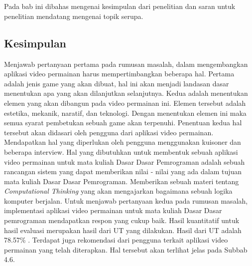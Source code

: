 \chapter{\babLima}
Pada bab ini dibahas mengenai kesimpulan dari penelitian dan saran untuk penelitian
mendatang mengenai topik serupa.
\section{Kesimpulan}
Menjawab pertanyaan pertama pada rumusan masalah, dalam mengembangkan aplikasi video permainan harus mempertimbangkan beberapa hal. Pertama adalah jenis game yang akan dibuat, hal ini akan menjadi landasan dasar menentukan apa yang akan dilanjutkan selanjutnya. Kedua adalah menentukan elemen yang akan dibangun pada video permainan ini. Elemen tersebut adalah estetika, mekanik, naratif, dan teknologi. Dengan menentukan elemen ini maka semua syarat pembetukan sebuah game akan terpenuhi. Penentuan kedua hal tersebut akan didasari oleh pengguna dari aplikasi video permainan. Mendapatkan hal yang diperlukan oleh pengguna menggunakan kuisoner dan beberapa interview. Hal yang dibutuhkan untuk membentuk sebuah aplikasi video permainan untuk mata kuliah Dasar Dasar Pemrograman adalah sebuah rancangan sistem yang dapat memberikan nilai - nilai yang ada dalam tujuan mata kuliah Dasar Dasar Pemrograman. Memberikan sebuah materi tentang \textit{Computational Thinking} yang akan mengajarkan bagaimana sebuah logika komputer berjalan.
\linebreak\linebreak
Untuk menjawab pertanyaan kedua pada rumusan masalah, implementasi aplikasi video permainan untuk mata kuliah Dasar Dasar pemrograman mendapatkan respon yang cukup baik. Hasil kuantitatif untuk hasil evaluasi merupakan hasil dari UT yang dilakukan. Hasil dari UT adalah 78.57\% . Terdapat juga rekomendasi dari pengguna terkait aplikasi video permainan yang telah diterapkan. Hal tersebut akan terlihat jelas pada Subbab 4.6.

